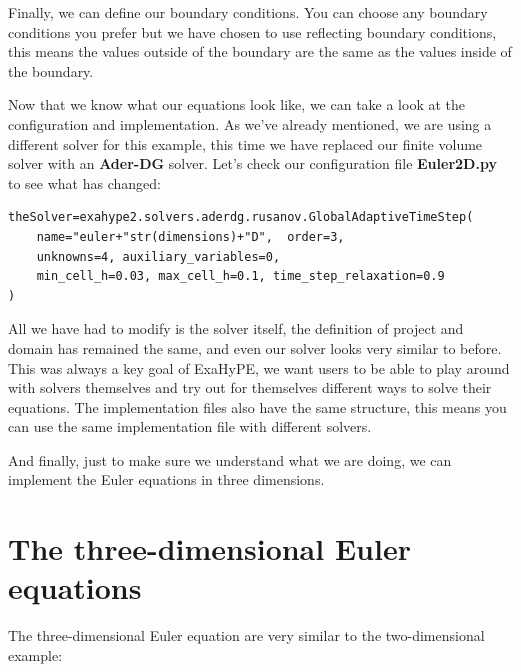 \documentclass[12pt,letterpaper]{article}
\begin{document}
Finally, we can define our boundary conditions. You can choose any boundary conditions you prefer but we have chosen to use reflecting boundary conditions, this means the values outside of the boundary are the same as the values inside of the boundary.

\newpage

Now that we know what our equations look like, we can take a look at the configuration and implementation. As we've already mentioned, we are using a different solver for this example, this time we have replaced our finite volume solver with an \textbf{Ader-DG} solver. Let's check our configuration file \textbf{Euler2D.py} to see what has changed:\\

\begin{lstlisting}[style = Python]
theSolver=exahype2.solvers.aderdg.rusanov.GlobalAdaptiveTimeStep(
    name="euler+"str(dimensions)+"D",  order=3,
    unknowns=4, auxiliary_variables=0,
    min_cell_h=0.03, max_cell_h=0.1, time_step_relaxation=0.9
)
\end{lstlisting}

All we have had to modify is the solver itself, the definition of project and domain has remained the same, and even our solver looks very similar to before. This was always a key goal of ExaHyPE, we want users to be able to play around with solvers themselves and try out for themselves different ways to solve their equations. The implementation files also have the same structure, this means you can use the same implementation file with different solvers.

And finally, just to make sure we understand what we are doing, we can implement the Euler equations in three dimensions.

\newpage



\section{The three-dimensional Euler equations}
\vspace{0.2cm}
The three-dimensional Euler equation are very similar to the two-dimensional example:
\end{document}
